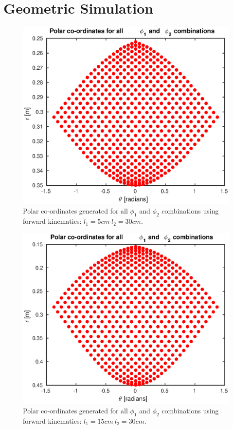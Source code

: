 \chapter{Geometric Simulation}

\begin{figure}
\centering
\includegraphics[width=1\textwidth]{images/geometry/forward-kinematic-leg-positions-5-30.eps}
\caption{Polar co-ordinates generated for all $\phi_1$ and $\phi_2$ combinations using forward kinematics: $l_1 = 5cm\ l_2 = 30cm$.}
\label{fig:Polar co-ordinates generated 5-30}
\end{figure}

\begin{figure}
\centering
\includegraphics[width=1\textwidth]{images/geometry/forward-kinematic-leg-positions.eps}
\caption{Polar co-ordinates generated for all $\phi_1$ and $\phi_2$ combinations using forward kinematics: $l_1 = 15cm\ l_2 = 30cm$.}
\label{fig:Polar co-ordinates generated 15-30}
\end{figure}

